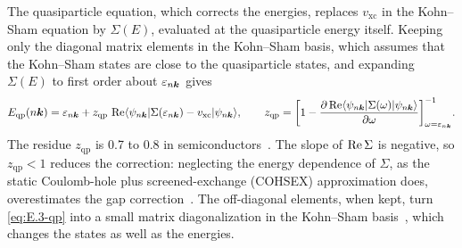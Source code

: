 The quasiparticle equation, which corrects the energies, replaces $v_{\mathrm{xc}}$ in the Kohn--Sham equation by $\Sigma(E)$, evaluated at the quasiparticle energy itself. Keeping only the diagonal matrix elements in the Kohn--Sham basis, which assumes that the Kohn--Sham states are close to the quasiparticle states, and expanding $\Sigma(E)$ to first order about $\varepsilon_{n\bm{k}}$ gives~\cite[Eqs.~(57) and (58)]{aryasetiawan1998gw}
\begin{equation}
  E_{\mathrm{qp}}(n\bm{k}) = \varepsilon_{n\bm{k}} + z_{\mathrm{qp}}\,\operatorname{Re}\langle\psi_{n\bm{k}}|\Sigma(\varepsilon_{n\bm{k}}) - v_{\mathrm{xc}}|\psi_{n\bm{k}}\rangle, \qquad
  z_{\mathrm{qp}} = \biggl[1 - \frac{\partial\operatorname{Re}\langle\psi_{n\bm{k}}|\Sigma(\omega)|\psi_{n\bm{k}}\rangle}{\partial\omega}\biggr]^{-1}_{\omega = \varepsilon_{n\bm{k}}} .
  \label{eq:E.3-qp}
\end{equation}
The residue $z_{\mathrm{qp}}$ is 0.7 to 0.8 in semiconductors~\cite[Sect.~V\,B]{aryasetiawan1998gw}. The slope of $\operatorname{Re}\Sigma$ is negative, so $z_{\mathrm{qp}} < 1$ reduces the correction: neglecting the energy dependence of $\Sigma$, as the static Coulomb-hole plus screened-exchange (COHSEX) approximation does, overestimates the gap correction~\cite[Sect.~V\,B]{aryasetiawan1998gw}. The off-diagonal elements, when kept, turn \cref{eq:E.3-qp} into a small matrix diagonalization in the Kohn--Sham basis~\cite[Eqs.~(17) and (18)]{deslippe2012berkeleygw}, which changes the states as well as the energies.

